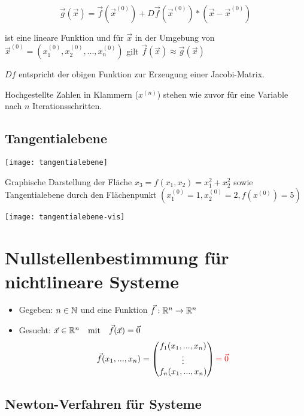 $$\vec{g}(\vec{x}) = \vec{f}(\vec{x}^{(0)}) + D\vec{f}(\vec{x}^{(0)}) * (\vec{x} - \vec{x}^{(0)})$$

ist eine lineare Funktion und für $\vec{x}$ in der Umgebung von
$\vec{x}^{(0)} = (x^{(0)}_1,x^{(0)}_2, ..., x^{(0)}_n)$
gilt $\vec{f}(\vec{x}) \approx \vec{g}(\vec{x})$

$Df$ entspricht der obigen Funktion zur Erzeugung einer Jacobi-Matrix.

Hochgestellte Zahlen in Klammern ($x^{(n)}$) stehen wie zuvor für eine Variable
nach $n$ Iterationsschritten.



\subsection{Tangentialebene}

\texttt{[image: tangentialebene]}


Graphische Darstellung der Fläche $x_3 = f(x_1, x_2) = x_1^2 + x_2^2$
sowie Tangentialebene durch den Flächenpunkt $(x^{(0)}_1 = 1, x^{(0)}_2 = 2, f(x^{(0)}) = 5)$


\texttt{[image: tangentialebene-vis]}








\section{Nullstellenbestimmung für nichtlineare Systeme}


\begin{itemize}
	\item Gegeben: $n \in \mathbb{N}$ und eine Funktion $\vec{f} : \mathbb{R}^n \to \mathbb{R}^n$
	\item Gesucht: $\vec{x} \in \mathbb{R}^n \quad \mathrm{mit} \quad \vec{f}(\vec{x}) = \vec 0$
	      $$
		      \vec{f}(x_1,...,x_n) =
		      \begin{pmatrix}
			      f_1(x_1,...,x_n) \\
			      \vdots           \\
			      f_n(x_1,...,x_n) \\
		      \end{pmatrix}
              \textcolor{red}{= \vec 0}
	      $$
\end{itemize}






\subsection{Newton-Verfahren für Systeme}



